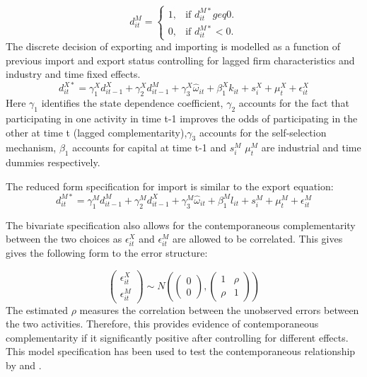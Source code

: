 \documentclass[12pt]{article}
\begin{document}
\begin{equation}
  d_{it}^{M}=\begin{cases}
   1 , & \text{if $d_{it}^{M*}geq  0$}.\\
   0 , & \text{if $d_{it}^{M*}<  0$}.
  \end{cases}
\end{equation}
The discrete decision of exporting and importing is modelled as a function of previous import and
export status controlling for lagged firm characteristics and industry and time fixed
effects. 
\begin{equation}
d_{it}^{X*} = \gamma_{1}^{X} d_{it-1}^{X} + \gamma_{2}^{X} d_{it-1}^{M}+
\gamma_{3}^{X} \hat{\omega}_{it}  + \beta_{1}^{X}k_{it}  +
s_{i}^{X} + \mu_{t}^{X}  + \epsilon_{it}^{X}
\end{equation}
Here $\gamma_{1}$ identifies the state dependence coefficient, $\gamma_{2}$ accounts for
the fact that participating in one activity in time t-1 improves the
odds of participating in the other at time t (lagged complementarity),$\gamma_{3}$ accounts for
the self-selection mechanism, $\beta_{1}$ accounts for capital at time
t-1 and $s_{i}^{M}$  $\mu_{t}^{M}$ are industrial
and time dummies respectively.

The reduced form specification for import is similar to the export
equation:
\begin{equation}
d_{it}^{M*} = \gamma_{1}^{M} d_{it-1}^{M} + \gamma_{2}^{M} d_{it-1}^{X}+
\gamma_{3}^{M} \hat{\omega}_{it}  + \beta_{1}^{M}l_{it}  +
s_{i}^{M} + \mu_{t}^{M}  + \epsilon_{it}^{M}
\end{equation}

The bivariate specification also allows for the
contemporaneous complementarity between the two choices as
$\epsilon_{it}^{X}$ and $\epsilon_{it}^{M}$ are allowed to be
correlated. This gives gives the following form to the error
structure: 


\[\begin{pmatrix}
\epsilon_{it}^{X} \\
\epsilon_{it}^{M}
\end{pmatrix}\sim N\left(\begin{pmatrix}
0 \\
0
\end{pmatrix},\begin{pmatrix}
1 & \rho \\
\rho & 1
\end{pmatrix}\right)
\]
The estimated $\rho$ measures the correlation between the unobserved
errors between the two activities. Therefore, this provides evidence
of contemporaneous complementarity if it significantly positive after
controlling for different effects. 
This model specification has been used to test the contemporaneous relationship
by \textcite{aristei2013firms} and \textcite{aw2011}. 
\end{document}
